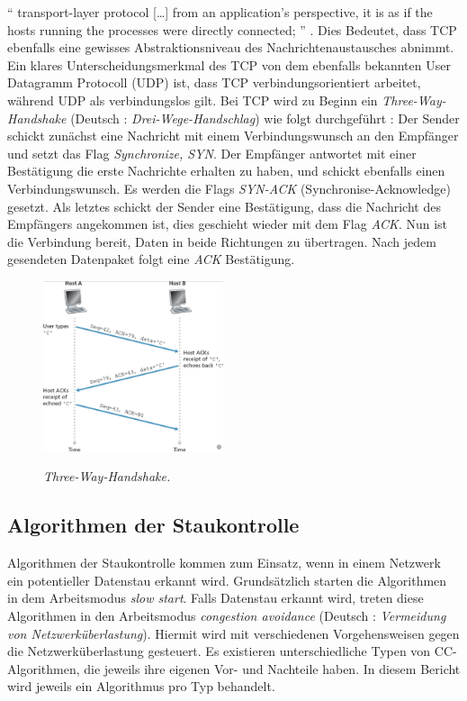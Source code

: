 \documentclass[paper=a4,fontsize=12pt,ngerman]{scrartcl}
\begin{document}
`` transport-layer protocol [\dots] from an application’s perspective, it is as if 
the hosts running the processes were directly connected; '' \cite[241]{kr22}. 
\newline
Dies Bedeutet, dass TCP ebenfalls eine gewisses Abstraktionsniveau
des Nachrichtenaustausches abnimmt. 
\newline
Ein klares Unterscheidungsmerkmal des TCP von dem ebenfalls bekannten User Datagramm Protocoll (UDP)
ist, dass TCP verbindungsorientiert arbeitet, während UDP als verbindungslos gilt.
Bei TCP wird zu Beginn ein \textit{Three-Way-Handshake} (Deutsch : \textit{Drei-Wege-Handschlag})
wie folgt durchgeführt : 
\newline
Der Sender schickt zunächst eine Nachricht mit einem Verbindungswunsch an den Empfänger und setzt das Flag 
\textit{Synchronize, SYN}.
\newline
Der Empfänger antwortet mit einer Bestätigung die erste Nachrichte erhalten zu haben, und schickt ebenfalls einen 
Verbindungswunsch. Es werden die Flags \textit{SYN-ACK} (Synchronise-Acknowledge) gesetzt.
\newline
Als letztes schickt der Sender eine Bestätigung, dass die Nachricht des Empfängers angekommen ist, dies geschieht wieder
mit dem Flag \textit{ACK}. Nun ist die Verbindung bereit, Daten in beide Richtungen zu übertragen.
Nach jedem gesendeten Datenpaket folgt eine \textit{ACK} Bestätigung.

\begin{figure}[ht]
    \centering
    \includegraphics[height = 5cm]{./graphics/3way.png}
    \caption{\textit{Three-Way-Handshake.}}  \cite[296]{kr22}
\end{figure}



\subsection{Algorithmen der Staukontrolle }

Algorithmen der Staukontrolle kommen zum Einsatz, wenn in einem Netzwerk ein potentieller Datenstau erkannt wird.
Grundsätzlich starten die Algorithmen in dem Arbeitsmodus \textit{slow start}.
Falls Datenstau erkannt wird, treten diese Algorithmen in den Arbeitsmodus \textit{congestion avoidance}
(Deutsch : \textit{Vermeidung von Netzwerküberlastung}). Hiermit wird mit verschiedenen Vorgehensweisen gegen die
Netzwerküberlastung gesteuert. 
\newline
Es existieren unterschiedliche Typen von CC-Algorithmen, die jeweils ihre eigenen Vor- und Nachteile haben.
In diesem Bericht wird jeweils ein Algorithmus pro Typ behandelt.
\end{document}
